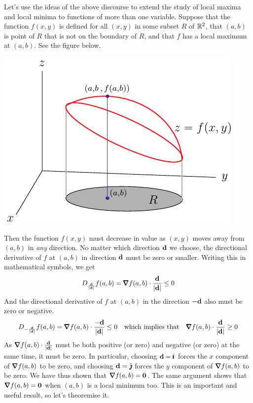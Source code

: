 Let's use the ideas of the above discourse to extend the study of
local maxima and local minima to functions of more than one variable.
Suppose that the function $f(x,y)$ is defined for all $(x,y)$ in some
subset $R$ of $\mathbb{R}^2$, that $(a,b)$ is point of $R$ that is not on the boundary of $R$, and that $f$ has a local maximum at $(a,b)$.
See the figure below.
\begin{efig}
\begin{center}
   \includegraphics{max.pdf}
\end{center}
\end{efig}
Then the function $f(x,y)$ must decrease in value as $(x,y)$ moves away from $(a,b)$ in \emph{any} direction. No matter which direction $\mathbf{d}$ we choose,
the directional derivative of $f$ at $(a,b)$ in direction $\mathbf{d}$ 
must be zero or smaller. Writing this in mathematical symbols, we get
\begin{align*}
D_{\frac{\vd}{|\vd|}} f(a,b) = \vnabla f(a,b)\cdot\frac{\vd}{|\vd|}\le 0
\end{align*}
And the directional derivative of $f$ at $(a,b)$ in the direction $-\mathbf{d}$ 
also must be zero or negative.
\begin{align*}
D_{-\frac{\vd}{|\vd|}} f(a,b) = \vnabla f(a,b)\cdot\frac{-\vd}{|\vd|}\le 0
\quad\text{which implies that}\quad \vnabla f(a,b)\cdot\frac{\vd}{|\vd|}\ge 0
\end{align*}
As $\vnabla f(a,b)\cdot\frac{\vd}{|\vd|}$ must be both positive (or zero)
and negative (or zero) at the same time, it must be zero. 
In particular, choosing $\mathbf{d}=\hat{\pmb{\imath}}$ forces the $x$ component of 
$\vnabla f(a,b)$ to be zero, and  choosing 
$\mathbf{d}=\hat{\pmb{\jmath}}$ forces the $y$ component of $\vnabla f(a,b)$ to be zero.
We have thus shown that  $\vnabla f(a,b)=\vZero$. The same argument
shows that $\vnabla f(a,b)=\vZero$ when $(a,b)$ is a local minimum too.
This is an important and useful result, so let's theoremise it.

